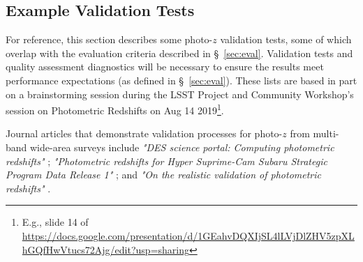 \documentclass[DM,authoryear,toc]{lsstdoc}
\begin{document}
\begin{enumerate}
\subsection{Example Validation Tests}\label{ssec:imp_val}

For reference, this section describes some photo-$z$ validation tests, some of which overlap with the evaluation criteria described in \S~\ref{sec:eval}. 
Validation tests and quality assessment diagnostics will be necessary to ensure the results meet performance expectations (as defined in \S~\ref{sec:eval}).
These lists are based in part on a brainstorming session during the LSST Project and Community Workshop's session on Photometric Redshifts on Aug 14 2019\footnote{E.g., slide 14 of \url{https://docs.google.com/presentation/d/1GEahvDQXIjSL4lLVjDlZHV5zpXLhGQfHwVtucs72Ajg/edit?usp=sharing}}.

Journal articles that demonstrate validation processes for photo-$z$ from multi-band wide-area surveys include {\it "DES science portal: Computing photometric redshifts"} \citep{2018A&C....25...58G}; {\it "Photometric redshifts for Hyper Suprime-Cam Subaru Strategic Program Data Release 1"} \citep{2018PASJ...70S...9T}; and {\it "On the realistic validation of photometric redshifts"} \citep{2017MNRAS.468.4323B}. 


\end{enumerate}
\end{document}
